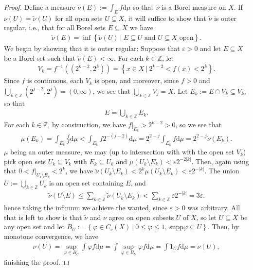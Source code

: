 \documentclass[10pt,twoside,openany,final]{memoir}
\theoremstyle{definition}
\theoremstyle{Break}
\newcommand{\Z}{\mathbb{Z}}
\renewcommand{\d}{\mathrm{d}}
\begin{document}
\begin{proof}
	Define a measure $\tilde{\nu}(E):=\int_{E}f \d \mu$ so that $\tilde{\nu}$ is a Borel measure on $X$. If $\nu(U)=\tilde{\nu}(U)$ for all open sets $U\subseteq X$, it will suffice to show that $\tilde{\nu}$ is outer regular, i.e., that for all Borel sets $E \subseteq X$ we have
	\begin{align*}
		\tilde{\nu}(E)=\inf\left\{ \tilde{\nu}(U) \ | \ E \subseteq U \text{ and } U \subseteq X \text{ open} \right\}.
	\end{align*}
	We begin by showing that it is outer regular: Suppose that $\varepsilon>0$ and let $E\subseteq X$ be a Borel set such that $\tilde{\nu}(E) < \infty$. For each $k \in \Z$, let
	\begin{align*}
		V_k=f^{-1}\left( \left( 2^{k-2},2^k \right) \right)=\left\{ x \in X \ | \ 2^{k-2} < f(x) < 2^{k} \right\}.
	\end{align*}
	Since $f$ is continuous, each $V_k$ is open, and moreover, since $f>0$ and $\bigcup_{k \in \Z} (2^{j-2},2^j)=(0,\infty)$, we see that $\bigcup_{k \in \Z}V_j=X$. Let $E_k:=E\cap V_k \subseteq V_k$, so that
	\begin{align*}
		E = \bigcup_{k \in \Z}E_k.
	\end{align*}
	For each $k \in \Z$, by construction, we have $f|_{E_k}>2^{k-2}>0$, so we see that 
	\begin{align*}
		\mu(E_k)=\int_{E_k} \frac{f}{f} \d \mu < \int_{E_k} f 2^{-(j-2)} \d \mu = 2^{2-j}\int_{E_k}f \d \mu = 2^{2-j}\tilde{\nu}(E_k).
	\end{align*}
	$\mu$ being an outer measure, we may (up to intersection with with the open set $V_k$) pick open sets $U_k\subseteq V_k$ with $E_k \subseteq U_k$ and $\mu(U_k\setminus E_k)<\varepsilon2^{-2|k|}$. Then, again using that $0<f|_{U_k\setminus E_k}<2^{k}$, we have $\tilde{\nu}(U_k\setminus E_k)<2^k \mu(U_k \setminus E_k) < \varepsilon 2^{-|k|}$. The union $ U:=\bigcup_{k \in \Z}U_k$ is an open set containing $E$, and
	\begin{align*}
		\tilde{\nu}(U\setminus E) \leq \sum_{k \in \Z} \tilde{\nu}(U_k \setminus E_k) < \sum_{k \in \Z}	\varepsilon 2^{-|k|}=3\varepsilon.
	\end{align*}
	hence taking the infimum we achieve the wanted, since $\varepsilon>0$ was arbitrary. All that is left to show is that $\tilde{\nu}$ and $\nu$ agree on open subsets $U$ of $X$, so let $U \subseteq X$ be any open set and let $B_U:=\left\{ \varphi \in C_c(X) \ | \ 0 \leq \varphi \leq 1, \ \textrm{supp}\varphi \subseteq U \right\}$. Then, by monotone convergence, we have
	\begin{align*}
		\nu(U) = \sup_{\varphi \in B_U} \int \varphi f \d \mu = \int \sup_{\varphi \in B_U} \varphi f \d \mu = \int 1_{U} f \d \mu = \tilde{\nu}(U),
	\end{align*}
	finishing the proof.
\end{proof}
\end{document}
